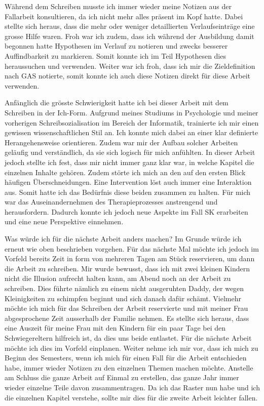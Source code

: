 Während dem Schreiben musste ich immer wieder meine Notizen aus der Fallarbeit konsultieren, da ich nicht mehr alles präsent im Kopf hatte. Dabei stellte sich heraus, dass die mehr oder weniger detaillierten Verlaufseinträge eine grosse Hilfe waren. Froh war ich zudem, dass ich während der Ausbildung damit begonnen hatte Hypothesen im Verlauf zu notieren und zwecks besserer Auffindbarkeit zu markieren. Somit konnte ich im Teil Hypothesen dies heraussuchen und verwenden. Weiter war ich froh, dass ich mir die Zieldefinition nach GAS notierte, somit konnte ich auch diese Notizen direkt für diese Arbeit verwenden. 

Anfänglich die grösste Schwierigkeit hatte ich bei dieser Arbeit mit dem Schreiben in der Ich-Form. Aufgrund meines Studiums in Psychologie und meiner vorherigen Schreibsozialisation im Bereich der Informatik, trainierte ich mir einen gewissen wissenschaftlichen Stil an. Ich konnte mich dabei an einer klar definierte Herangehensweise orientieren. Zudem war mir der Aufbau solcher Arbeiten geläufig und verständlich, da sie sich logisch für mich anfühlten. In dieser Arbeit jedoch stellte ich fest, dass mir nicht immer ganz klar war, in welche Kapitel die einzelnen Inhalte gehören. Zudem störte ich mich an den auf den ersten Blick häufigen Überschneidungen. Eine Intervention löst auch immer eine Interaktion aus. Somit hatte ich das Bedürfnis diese beiden zusammen zu halten. Für mich war das Auseinandernehmen des Therapieprozesses anstrengend und herausfordern. Dadurch konnte ich jedoch neue Aspekte im Fall SK erarbeiten und eine neue Perspektive einnehmen. 

Was würde ich für die nächste Arbeit anders machen? Im Grunde würde ich erneut wie oben beschrieben vorgehen. Für das nächste Mal möchte ich jedoch im Vorfeld bereits Zeit in form von mehreren Tagen am Stück reservieren, um dann die Arbeit zu schreiben. Mir wurde bewusst, dass ich mit zwei kleinen Kindern nicht die Illusion aufrecht halten kann, am Abend noch an der Arbeit zu schreiben. Dies führte nämlich zu einem nicht ausgeruhten Daddy, der wegen Kleinigkeiten zu schimpfen beginnt und sich danach dafür schämt. Vielmehr möchte ich mich für das Schreiben der Arbeit reservierte und mit meiner Frau abgesprochene Zeit ausserhalb der Familie nehmen. Es stellte sich heraus, dass eine Auszeit für meine Frau mit den Kindern für ein paar Tage bei den Schwiegereltern hilfreich ist, da dies uns beide entlastet. Für die nächste Arbeit möchte ich dies im Vorfeld einplanen. Weiter nehme ich mir vor, dass ich mich zu Beginn des Semesters, wenn ich mich für einen Fall für die Arbeit entschieden habe, immer wieder Notizen zu den einzelnen Themen machen möchte. Anstelle am Schluss die ganze Arbeit auf Einmal zu erstellen, das ganze Jahr immer wieder einzelne Teile davon zusammentragen. Da ich das Raster nun habe und ich die einzelnen Kapitel verstehe, sollte mir dies für die zweite Arbeit leichter fallen. 

